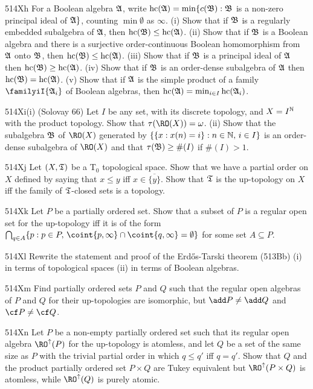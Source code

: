 {\def\hc{\mathop{\text{hc}}\nolimits}
\spheader 514Xh
For a Boolean algebra $\frak A$, write
$\hc(\frak A)
=\min\{c(\frak B):\frak B$ is a non-zero principal ideal of $\frak A\}$,
counting $\min\emptyset$ as $\infty$.   (i) Show that if $\frak B$ is a
regularly embedded subalgebra of $\frak A$, then
$\hc(\frak B)\le\hc(\frak A)$.
(ii) Show that if $\frak B$ is a Boolean algebra and there is a surjective
order-continuous Boolean homomorphism from $\frak A$ onto $\frak B$, then
$\hc(\frak B)\le\hc(\frak A)$.   (iii) Show that if $\frak B$ is a
principal ideal of $\frak A$ then $\hc(\frak B)\ge\hc(\frak A)$.
(iv) Show that if $\frak B$ is an
order-dense subalgebra of $\frak A$ then $\hc(\frak B)=\hc(\frak A)$.
(v) Show that if $\frak A$ is the simple product of a family
$\familyiI{\frak A_i}$ of Boolean algebras, then
$\hc(\frak A)=\min_{i\in I}\hc(\frak A_i)$.

\sqheader 514Xi(i) ({\smc Solovay 66})
Let $I$ be any set, with its discrete topology, and
$X=I^{\Bbb N}$ with the product topology.
Show that $\tau(\RO(X))=\omega$.
(ii) Show that the subalgebra $\frak B$ of
$\RO(X)$ generated by $\{\{x:x(n)=i\}:n\in\Bbb N,\,i\in I\}$ is
an order-dense subalgebra of $\RO(X)$ and that $\tau(\frak B)\ge\#(I)$
if $\#(I)>1$.

\spheader 514Xj Let $(X,\frak T)$ be a T$_0$ topological space.   Show
that we have a partial order on $X$ defined by saying that $x\le y$ iff
$x\in\overline{\{y\}}$.   Show that $\frak T$ is the up-topology on $X$
iff the family of $\frak T$-closed sets is a topology.

\spheader 514Xk Let $P$ be a partially ordered set.   Show that a subset
of $P$ is a regular open set for the up-topology iff it is of the form
$\bigcap_{q\in A}
\{p:p\in P,\,\coint{p,\infty}\cap\coint{q,\infty}=\emptyset\}$ for some
set $A\subseteq P$.

\sqheader 514Xl Rewrite the statement and proof of the Erd\H{o}s-Tarski
theorem (513Bb) (i) in terms of topological spaces (ii) in terms of
Boolean algebras.

\spheader 514Xm Find partially ordered sets $P$ and $Q$ such that the
regular open algebras of $P$ and $Q$ for their up-topologies are
isomorphic, but $\add P\ne\add Q$ and $\cf P\ne\cf Q$.

\spheader 514Xn Let $P$ be a non-empty partially ordered set such that
its regular open algebra $\RO^{\uparrow}(P)$ for the up-topology is
atomless, and let $Q$ be a set of the same size as $P$ with the trivial
partial order in which $q\le q'$ iff $q=q'$.   Show that $Q$ and the
product partially ordered set $P\times Q$ are Tukey equivalent but
$\RO^{\uparrow}(P\times Q)$ is atomless, while $\RO^{\uparrow}(Q)$ is
purely atomic.

}

